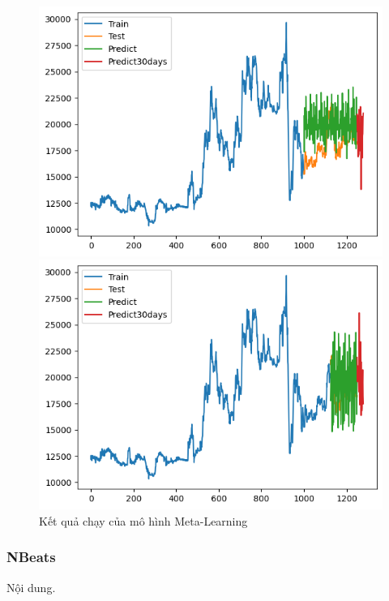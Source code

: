 \begin{figure}[H]
\begin{minipage}{0.15\textwidth}
    \includegraphics[width=1\textwidth]{resources/chapter-5/result/EXB_ML_8_2.png}
    \end{minipage}
    \hfill
        \begin{minipage}{0.15\textwidth}
    \centering
    \includegraphics[width=1\textwidth]{resources/chapter-5/result/EXB_ML_9_1.png}
    \end{minipage}
    \hfill
    
    \caption{Kết quả chạy của mô hình Meta-Learning}
    \label{fig:ml_result}
\end{figure}





\subsubsection{NBeats}
Nội dung.




